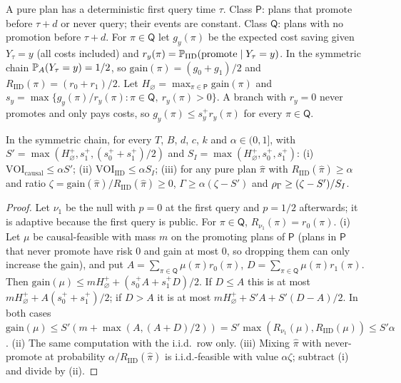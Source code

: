 A pure plan has a deterministic first query time $\tau$. Class $\mathsf P$: plans that promote before $\tau+d$ or never query; their events are constant. Class $\mathsf Q$: plans with no promotion before $\tau+d$. For $\pi\in\mathsf Q$ let $g_y(\pi)$ be the expected cost saving given $Y_\tau=y$ (all costs included) and $r_y(\pi)=\mathbb{P}_{\mathrm{IID}}(\text{promote}\mid Y_\tau=y)$. In the symmetric chain $\mathbb{P}_A(Y_\tau=y)=1/2$, so $\mathrm{gain}(\pi)=(g_0+g_1)/2$ and $R_{\mathrm{IID}}(\pi)=(r_0+r_1)/2$. Let $H_\varnothing=\max_{\pi\in\mathsf P}\mathrm{gain}(\pi)$ and $s_y=\max\{g_y(\pi)/r_y(\pi):\pi\in\mathsf Q,\ r_y(\pi)>0\}$. A branch with $r_y=0$ never promotes and only pays costs, so $g_y(\pi)\le s_y^+r_y(\pi)$ for every $\pi\in\mathsf Q$.

\begin{lemma}
\label{lem:M3}
In the symmetric chain, for every $T$, $B$, $d$, $c$, $k$ and $\alpha\in(0,1]$, with $S'=\max(H_\varnothing^+,s_1^+,(s_0^++s_1^+)/2)$ and $S_I=\max(H_\varnothing^+,s_0^+,s_1^+)$:
(i) $\mathrm{VOI}_{\mathrm{causal}}\le\alpha S'$; (ii) $\mathrm{VOI}_{\mathrm{IID}}\le\alpha S_I$; (iii) for any pure plan $\hat\pi$ with $R_{\mathrm{IID}}(\hat\pi)\ge\alpha$ and ratio $\zeta=\mathrm{gain}(\hat\pi)/R_{\mathrm{IID}}(\hat\pi)\ge0$, $\Gamma\ge\alpha(\zeta-S')$ and $\rho_\Gamma\ge(\zeta-S')/S_I$.
\end{lemma}

\begin{proof}
Let $\nu_1$ be the null with $p=0$ at the first query and $p=1/2$ afterwards; it is adaptive because the first query is public. For $\pi\in\mathsf Q$, $R_{\nu_1}(\pi)=r_0(\pi)$. (i) Let $\mu$ be causal-feasible with mass $m$ on the promoting plans of $\mathsf P$ (plans in $\mathsf P$ that never promote have risk 0 and gain at most 0, so dropping them can only increase the gain), and put $A=\sum_{\pi\in\mathsf Q}\mu(\pi)r_0(\pi)$, $D=\sum_{\pi\in\mathsf Q}\mu(\pi)r_1(\pi)$. Then $\mathrm{gain}(\mu)\le mH_\varnothing^++(s_0^+A+s_1^+D)/2$. If $D\le A$ this is at most $mH_\varnothing^++A(s_0^++s_1^+)/2$; if $D>A$ it is at most $mH_\varnothing^++S'A+S'(D-A)/2$. In both cases $\mathrm{gain}(\mu)\le S'(m+\max(A,(A+D)/2))=S'\max(R_{\nu_1}(\mu),R_{\mathrm{IID}}(\mu))\le S'\alpha$. (ii) The same computation with the i.i.d.\ row only. (iii) Mixing $\hat\pi$ with never-promote at probability $\alpha/R_{\mathrm{IID}}(\hat\pi)$ is i.i.d.-feasible with value $\alpha\zeta$; subtract (i) and divide by (ii).
\end{proof}

